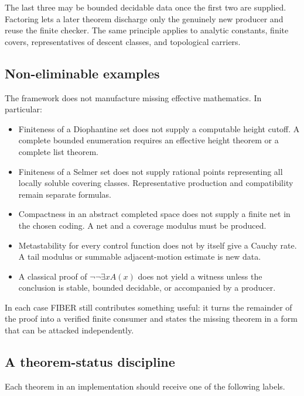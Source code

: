 The last three may be bounded decidable data once the first two are supplied.
Factoring lets a later theorem discharge only the genuinely new producer and
reuse the finite checker.  The same principle applies to analytic constants,
finite covers, representatives of descent classes, and topological carriers.

\subsection{Non-eliminable examples}

The framework does not manufacture missing effective mathematics.  In
particular:

\begin{itemize}
\item Finiteness of a Diophantine set does not supply a computable height
      cutoff.  A complete bounded enumeration requires an effective height
      theorem or a complete list theorem.
\item Finiteness of a Selmer set does not supply rational points representing
      all locally soluble covering classes.  Representative production and
      compatibility remain separate formulas.
\item Compactness in an abstract completed space does not supply a finite net
      in the chosen coding.  A net and a coverage modulus must be produced.
\item Metastability for every control function does not by itself give a
      Cauchy rate.  A tail modulus or summable adjacent-motion estimate is new
      data.
\item A classical proof of \(\neg\neg\exists x A(x)\) does not yield a witness
      unless the conclusion is stable, bounded decidable, or accompanied by a
      producer.
\end{itemize}

In each case FIBER still contributes something useful: it turns the remainder
of the proof into a verified finite consumer and states the missing theorem in
a form that can be attacked independently.

\subsection{A theorem-status discipline}

Each theorem in an implementation should receive one of the following labels.

